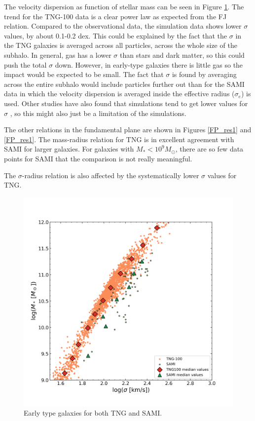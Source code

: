 The velocity dispersion as function of stellar mass can be seen in Figure \ref{FJ_res}. The trend for the TNG-100 data is a clear power law as expected from the FJ relation. Compared to the observational data, the simulation data shows lower $\sigma$ values, by about 0.1-0.2 dex. This could be explained by the fact that the $\sigma$ in the TNG galaxies is averaged across all particles, across the whole size of the subhalo. In general, gas has a lower $\sigma$ than stars and dark matter, so this could push the total $\sigma$ down. However, in early-type galaxies there is little gas so the impact would be expected to be small. The fact that $\sigma$ is found by averaging across the entire subhalo would include particles further out than for the SAMI data in which the velocity dispersion is averaged inside the effective radius ($\sigma_{e}$) is used. Other studies have also found that simulations tend to get lower values for $\sigma$ \parencite{Sande2018}, so this might also just be a limitation of the simulations.

The other relations in the fundamental plane are shown in Figures \ref{FP_res1} and \ref{FP_res1}. The mass-radius relation for TNG is in excellent agreement with SAMI for larger galaxies. For galaxies with $M_*<10^9 M_{\odot}$, there are so few data points for SAMI that the comparison is not really meaningful. 

The $\sigma$-radius relation is also affected by the systematically lower $\sigma$ values for TNG. 

\begin{figure}
    \centering
    \includegraphics[width=\textwidth]{images/results_faber_jackson.png}
    \caption{Early type galaxies for both TNG and SAMI.}
    \label{FJ_res}
\end{figure}

